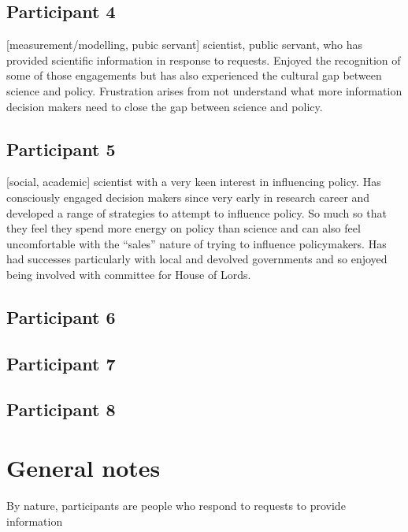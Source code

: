 \subsection{Participant 4}\label{sec:p4}
[measurement/modelling, pubic servant] scientist, public servant, who has provided scientific information in response to requests. Enjoyed the recognition of some of those engagements but has also experienced the cultural gap between science and policy. Frustration arises from not understand what more information decision makers need to close the gap between science and policy.

\subsection{Participant 5}\label{sec:p5}
[social, academic] scientist with a very keen interest in influencing policy. Has consciously engaged decision makers since very early in research career and developed a range of strategies to attempt to influence policy. So much so that they feel they spend more energy on policy than science and can also feel uncomfortable with the ``sales'' nature of trying to influence policymakers. Has had successes particularly with local and devolved governments and so enjoyed being involved with committee for House of Lords.

\subsection{Participant 6}\label{sec:p6}
\subsection{Participant 7}\label{sec:p7}
\subsection{Participant 8}\label{sec:p8}

\section{General notes}
By nature, participants are people who respond to requests to provide information


%
